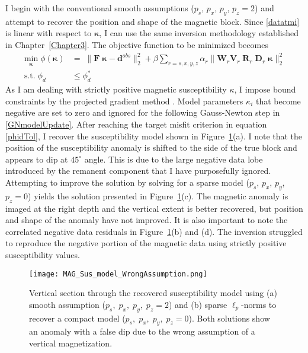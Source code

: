 I begin with the conventional smooth assumptions ($p_s$, $p_x$, $p_y$, $p_z = 2$) and attempt to recover the position and shape of the magnetic block.
Since \eqref{datatmi} is linear with respect to $\boldsymbol{\kappa}$, I can use the same inversion methodology established in Chapter~\ref{Chapter3}. The objective function to be minimized becomes
\begin{equation}\label{ObjFun3D_kappa}
\begin{split}
\underset{\boldsymbol{\kappa}}{\text{min}}\; \phi(\boldsymbol{\kappa}) & = \; \|\mathbf{F}\;\boldsymbol{\kappa} - \mathbf{d}^{obs}\|_2^2 + \beta \sum_{r=s,x,y,z} \alpha_r \|\mathbf{W}_r \mathbf{V}_r \;\mathbf{R}_r\;\mathbf{D}_r \;\boldsymbol{\kappa}\|_2^2 \\
\text{s.t.} \; \phi_d & \leq \phi_d^* \;
\end{split}
\end{equation}
As I am dealing with strictly positive magnetic susceptibility $\kappa$, I impose bound constraints by the projected gradient method \cite[]{Vogel02}. Model parameters $\kappa_i$ that become negative are set to zero and ignored for the following Gauss-Newton step in \eqref{GNmodelUpdate}.
After reaching the target misfit criterion in equation \eqref{phidTol}, I recover the susceptibility model shown in Figure~\ref{Susc_model}(a). I note that the position of the susceptibility anomaly is shifted to the side of the true block and appears to dip at $45^\circ$ angle. This is due to the large negative data lobe introduced by the remanent component that I have purposefully ignored. Attempting to improve the solution by solving for a sparse model ($p_s$, $p_x$, $p_y$, $p_z = 0$) yields the solution presented in Figure~\ref{Susc_model}(c). The magnetic anomaly is imaged at the right depth and the vertical extent is better recovered, but position and shape of the anomaly have not improved. It is also important to note the correlated negative data residuals in Figure~\ref{Susc_model}(b) and (d). The inversion struggled to reproduce the negative portion of the magnetic data using strictly positive susceptibility values.
\begin{figure}[h!]
\texttt{[image: MAG\_Sus\_model\_WrongAssumption.png]}
\caption{Vertical section through the recovered susceptibility model using (a) smooth assumption ($p_s, \;p_x,\; p_y,\; p_z = 2$) and (b) sparse $\ell_p$-norms to recover a compact model ($p_s,\;p_x,\; p_y,\; p_z = 0$). Both solutions show an anomaly with a false dip due to the wrong assumption of a vertical magnetization.}
\label{Susc_model}
\end{figure}

